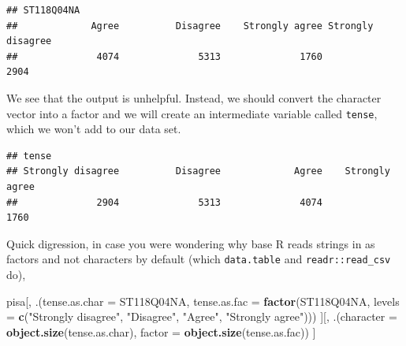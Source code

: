 \documentclass[]{book}
\newenvironment{Shaded}{\begin{snugshade}}{\end{snugshade}}
\newcommand{\DataTypeTok}[1]{\textcolor[rgb]{0.13,0.29,0.53}{#1}}
\newcommand{\KeywordTok}[1]{\textcolor[rgb]{0.13,0.29,0.53}{\textbf{#1}}}
\newcommand{\NormalTok}[1]{#1}
\newcommand{\OperatorTok}[1]{\textcolor[rgb]{0.81,0.36,0.00}{\textbf{#1}}}
\newcommand{\StringTok}[1]{\textcolor[rgb]{0.31,0.60,0.02}{#1}}
\begin{document}
\begin{verbatim}
## ST118Q04NA
##             Agree          Disagree    Strongly agree Strongly disagree 
##              4074              5313              1760              2904
\end{verbatim}

We see that the output is unhelpful. Instead, we should convert the character vector into a factor and we will create an intermediate variable called \texttt{tense}, which we won't add to our data set.

\begin{Shaded}
\end{Shaded}

\begin{verbatim}
## tense
## Strongly disagree          Disagree             Agree    Strongly agree 
##              2904              5313              4074              1760
\end{verbatim}

Quick digression, in case you were wondering why base R reads strings in as factors and not characters by default (which \texttt{data.table} and \texttt{readr::read\_csv} do),

\begin{Shaded}
\begin{Highlighting}[]
\NormalTok{pisa[, .(}\DataTypeTok{tense.as.char =}\NormalTok{ ST118Q04NA,}
         \DataTypeTok{tense.as.fac =} \KeywordTok{factor}\NormalTok{(ST118Q04NA, }\DataTypeTok{levels =} \KeywordTok{c}\NormalTok{(}\StringTok{"Strongly disagree"}\NormalTok{, }\StringTok{"Disagree"}\NormalTok{, }\StringTok{"Agree"}\NormalTok{, }\StringTok{"Strongly agree"}\NormalTok{)))}
\NormalTok{     ][,}
\NormalTok{       .(}\DataTypeTok{character =} \KeywordTok{object.size}\NormalTok{(tense.as.char),}
         \DataTypeTok{factor =} \KeywordTok{object.size}\NormalTok{(tense.as.fac))}
\NormalTok{     ]}
\end{Highlighting}
\end{Shaded}
\end{document}
